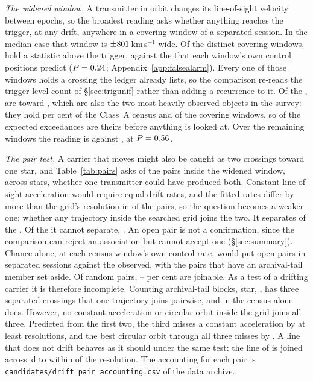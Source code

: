 \emph{The widened window.} A transmitter in orbit changes its line-of-sight
velocity between epochs, so the broadest reading asks whether anything
reaches the trigger, at any drift, anywhere in a covering window of a
separated session. In the median case that window is
$\pm801$\,km\,s$^{-1}$ wide. Of the \WuNWin{} distinct covering
windows, \WuNWinExc{} hold a statistic above the trigger, against the
\WuExpWinCtrl{} that each window's own control positions predict
($P=0.24$; Appendix~\ref{app:falsealarm}). Every one of those
windows holds a crossing the ledger already lists, so the comparison
re-reads the trigger-level count of \S\ref{sec:trigunif} rather than adding
a recurrence to it. Of the \WuNWinExc, \WuNWinExcTwo{} are toward
\WuTwoStars, which are also the two most heavily observed objects in the
survey: they hold \TwWinASharePct{} per cent of the Class~A census and
\TwNWinTwo{} of the \WuNWin{} covering windows, so \TwExpTwoCtrl{} of the
\WuExpWinCtrl{} expected exceedances are theirs before anything is looked
at. Over the remaining \WuNWinRest{} windows the reading is
\WuNWinRestExc{} against \WuExpRestCtrl, at $P=0.56$.

\emph{The pair test.} A carrier that moves might also be caught as two
crossings toward one star, and Table~\ref{tab:pairs} asks of the \TjNPair{}
pairs inside the widened window, across \TjNStarPair{} stars, whether one
transmitter could have produced both. Constant line-of-sight acceleration
would require equal drift rates, and the fitted rates differ by more than the
grid's resolution in \TjNUneqDrift{} of the \TjNPair{} pairs, so the question
becomes a weaker one: whether any trajectory inside the searched grid joins
the two. It separates \TjNExcl{} of the \TjNPair. Of the \TjNOpen{} it
cannot separate, \TjOpenEdgeClause. An open pair is not a confirmation, since the
comparison can reject an association but cannot accept one
(\S\ref{sec:summary}). Chance alone, at each census window's own control
rate, would put \OpExpSepRange{} open pairs in separated sessions against the
\OpObsSep{} observed, with the pairs that have an archival-tail member set
aside. Of random pairs, \OpJoinPctLo--\OpJoinPctHi{} per cent are
joinable. As a test of a drifting carrier it is therefore incomplete.
Counting archival-tail blocks, \OpNTriAllWord{} star, \OpTriStars, has three
separated crossings that one trajectory joins pairwise, and in the census
alone \OpNTriCenWord{} does. However, no constant acceleration or circular
orbit inside the grid joins all three. Predicted from the first two, the
third misses a constant acceleration by at least
\TrAMissMin{} resolutions, and the best circular orbit through all three
misses by \TrJointMissMin. A line that does not drift behaves as it should
under the same test: the \TjCtlLine{} line of \TjCtlStar{} is joined across
\TjCtlDtD\,d to within \TjCtlNSig{} of the resolution. The accounting for
each pair is
\texttt{candidates/\allowbreak drift\_pair\_accounting.csv} of the data
archive.

